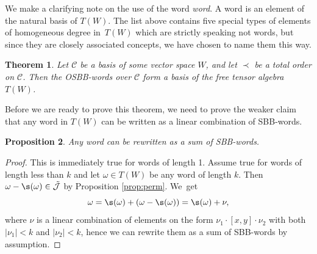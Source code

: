 \documentclass[pdftex]{sigma}
\numberwithin{equation}{section}
\newtheorem{Theorem}{Theorem}[section]
\newtheorem{Proposition}[Theorem]{Proposition}
 { \theoremstyle{definition}
\newtheorem{Definition}[Theorem]{Definition}
\newtheorem{Note}[Theorem]{Note}
\newtheorem{Example}[Theorem]{Example}
\newtheorem{Remark}[Theorem]{Remark} }
\begin{document}
We make a clarifying note on the use of the word \emph{word}. A word is an element of the natural basis of $T(W)$. The list above contains five special types of elements of homogeneous degree in~$T(W)$ which are strictly speaking not words, but since they are closely associated concepts, we have chosen to name them this way. %

\begin{Theorem}\label{th:OSBB}
 Let $\mathcal{C}$ be a basis of some vector space $W$, and let $\prec$ be a total order on $\mathcal{C}$. Then the OSBB-words over $\mathcal{C}$ form a basis of the free tensor algebra $T(W)$.
\end{Theorem}

Before we are ready to prove this theorem, we need to prove the weaker claim that any word in $T(W)$ can be written as a linear combination of SBB-words.


\begin{Proposition}\label{cor:SBB-word}
Any word can be rewritten as a sum of SBB-words.
\end{Proposition}

\begin{proof}
 This is immediately true for words of length 1. Assume true for words of length less than $k$ and let $\omega \in T(W)$ be any word of length $k$. Then $\omega - \s(\omega) \in \Tilde{\mathcal{J}}$ by Proposition \ref{prop:perm}. We~get
 \[
 \omega = \s(\omega) + (\omega - \s(\omega)) = \s(\omega) + \nu,
 \]
 where $\nu$ is a linear combination of elements on the form $\nu_1 \cdot [x,y] \cdot \nu_2$ with both $|\nu_1|<k$ and $|\nu_2|<k$, hence we can rewrite them as a sum of SBB-words by assumption.
\end{proof}
\end{document}
